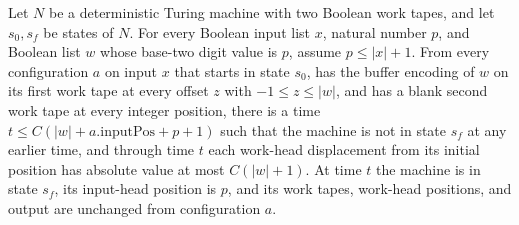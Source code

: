 \begin{definition}
\label{Turing.RecordStepSeekSpec}
\leanok
{}
Let $N$ be a deterministic Turing machine with two Boolean work tapes, and let $s_0,s_f$
be states of $N$. For every Boolean input list $x$, natural number $p$, and Boolean list
$w$ whose base-two digit value is $p$, assume $p\le |x|+1$. From every configuration $a$
on input $x$ that starts in state $s_0$, has the buffer encoding of $w$ on its first
work tape at every offset $z$ with $-1\le z\le |w|$, and has a blank second work tape at
every integer position, there is a time $t\le C(|w|+a.\mathrm{inputPos}+p+1)$ such that
the machine is not in state $s_f$ at any earlier time, and through time $t$ each
work-head displacement from its initial position has absolute value at most $C(|w|+1)$.
At time $t$ the machine is in state $s_f$, its input-head position is $p$, and its work
tapes, work-head positions, and output are unchanged from configuration $a$.
\end{definition}

